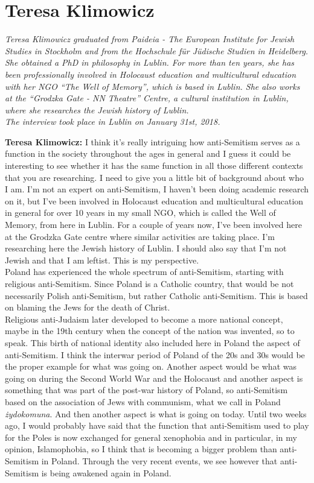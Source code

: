 \section{Teresa Klimowicz}

\textit{Teresa Klimowicz graduated from Paideia - The European Institute for Jewish Studies in Stockholm and from the Hochschule für Jüdische Studien in Heidelberg. She obtained a PhD in philosophy in Lublin. For more than ten years, she has been professionally involved in Holocaust education and multicultural education with her NGO ``The Well of Memory'', which is based in Lublin. She also works at the ``Grodzka Gate - NN Theatre'' Centre, a cultural institution in Lublin, where she researches the Jewish history of Lublin. \\ 
The interview took place in Lublin on January 31st, 2018.}\par
\vspace*{2em}
\textbf{Teresa Klimowicz:} I think it's really intriguing how anti-Semitism serves as a function in the society throughout the ages in general and I guess it could be interesting to see whether it has the same function in all those different contexts that you are researching. I need to give you a little bit of background about who I am. I'm not an expert on anti-Semitism, I haven't been doing academic research on it, but I've been involved in Holocaust education and multicultural education in general for over 10 years in my small NGO, which is called the Well of Memory, from here in Lublin. For a couple of years now, I've been involved here at the Grodzka Gate centre where similar activities are taking place. I'm researching here the Jewish history of Lublin. I should also say that I'm not Jewish and that I am leftist. This is my perspective.\\
\sloppy
Poland has experienced the whole spectrum of anti-Semitism, starting with religious anti-Semitism. Since Poland is a Catholic country, that would be not necessarily Polish anti-Semitism, but rather Catholic anti-Semitism. This is based on blaming the Jews for the death of Christ.\\
Religious anti-Judaism later developed to become a more national concept, maybe in the 19th century when the concept of the nation was invented, so to speak. This birth of national identity also included here in Poland the aspect of anti-Semitism. I think the interwar period of Poland of the 20s and 30s would be the proper example for what was going on. Another aspect would be what was going on during the Second World War and the Holocaust and another aspect is something that was part of the post-war history of Poland, so anti-Semitism based on the association of Jews with communism, what we call in Poland \textit{żydokomuna}. And then another aspect is what is going on today. Until two weeks ago, I would probably have said that the function that anti-Semitism used to play for the Poles is now exchanged for general xenophobia and in particular, in my opinion, Islamophobia, so I think that is becoming a bigger problem than anti-Semitism in Poland. Through the very recent events, we see however that anti-Semitism is being awakened again in Poland.  

